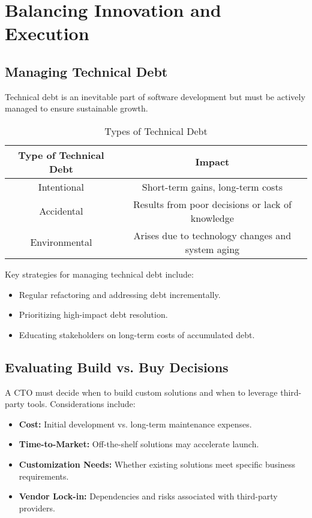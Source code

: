 \section{Balancing Innovation and Execution}

\subsection{Managing Technical Debt}
Technical debt is an inevitable part of software development but must be actively managed to ensure sustainable growth.

\begin{table}[h]
    \centering
    \begin{tabular}{|c|c|}
        \hline
        \textbf{Type of Technical Debt} & \textbf{Impact}                                   \\
        \hline
        Intentional                     & Short-term gains, long-term costs                 \\
        \hline
        Accidental                      & Results from poor decisions or lack of knowledge  \\
        \hline
        Environmental                   & Arises due to technology changes and system aging \\
        \hline
    \end{tabular}
    \caption{Types of Technical Debt}
\end{table}

Key strategies for managing technical debt include:

\begin{itemize}
    \item Regular refactoring and addressing debt incrementally.
    \item Prioritizing high-impact debt resolution.
    \item Educating stakeholders on long-term costs of accumulated debt.
\end{itemize}

\subsection{Evaluating Build vs. Buy Decisions}
A CTO must decide when to build custom solutions and when to leverage third-party tools. Considerations include:

\begin{itemize}
    \item \textbf{Cost:} Initial development vs. long-term maintenance expenses.
    \item \textbf{Time-to-Market:} Off-the-shelf solutions may accelerate launch.
    \item \textbf{Customization Needs:} Whether existing solutions meet specific business requirements.
    \item \textbf{Vendor Lock-in:} Dependencies and risks associated with third-party providers.
\end{itemize}

